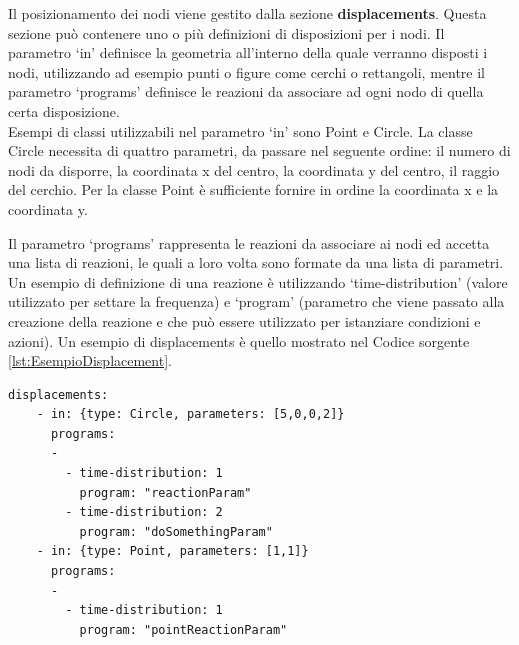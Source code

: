 Il posizionamento dei nodi viene gestito dalla sezione \textbf{displacements}. Questa sezione può contenere uno o più definizioni di disposizioni per i nodi.
Il parametro `in' definisce la geometria all'interno della quale verranno disposti i nodi, utilizzando ad esempio punti o figure come cerchi o rettangoli, mentre il parametro `programs' definisce le reazioni da associare ad ogni nodo di quella certa disposizione.
\\
Esempi di classi utilizzabili nel parametro `in' sono Point e Circle.
La classe Circle necessita di quattro parametri, da passare nel seguente ordine: il numero di nodi da disporre, la coordinata x del centro, la coordinata y del centro, il raggio del cerchio. Per la classe Point è sufficiente fornire in ordine la coordinata x e la coordinata y.

Il parametro `programs' rappresenta le reazioni da associare ai nodi ed accetta una lista di reazioni, le quali a loro volta sono formate da una lista di parametri. Un esempio di definizione di una reazione è utilizzando `time-distribution' (valore utilizzato per settare la frequenza) e `program' (parametro che viene passato alla creazione della reazione e che può essere utilizzato per istanziare condizioni e azioni).
Un esempio di displacements è quello mostrato nel Codice sorgente \ref{lst:EsempioDisplacement}.
\medskip
\begin{lstlisting}[firstnumber=last,label={lst:EsempioDisplacement},caption={Disposizione nodi e reazioni associate}]
  displacements:
    - in: {type: Circle, parameters: [5,0,0,2]}
      programs:
      -
        - time-distribution: 1
          program: "reactionParam"
        - time-distribution: 2
          program: "doSomethingParam"
    - in: {type: Point, parameters: [1,1]}
      programs:
      -
        - time-distribution: 1
          program: "pointReactionParam"
\end{lstlisting}
